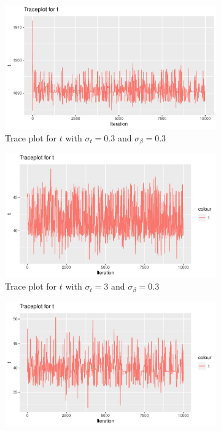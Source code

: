 \begin{figure}[H]
    \centering
    \begin{subfigure}[b]{0.49\textwidth}
        \centering
        \includegraphics[width = \textwidth]{Images/block_sim_t_sigma03.pdf}
        \caption{Trace plot for $t$ with $\sigma_t = 0.3$ and $\sigma_{\beta} = 0.3$}
        \label{fig:block_sim_t_sigma03}
    \end{subfigure}
    \begin{subfigure}[b]{0.49\textwidth}
        \centering
        \includegraphics[width = \textwidth]{Images/block_sim_t.pdf}
        \caption{Trace plot for $t$ with $\sigma_t = 3$ and $\sigma_{\beta} = 0.3$}
        \label{fig:block_sim_t}
    \end{subfigure}
    \begin{subfigure}[b]{0.49\textwidth}
        \centering
        \includegraphics[width = \textwidth]{Images/block_sim_t_sigma10.pdf}

\end{subfigure}
\end{figure}
